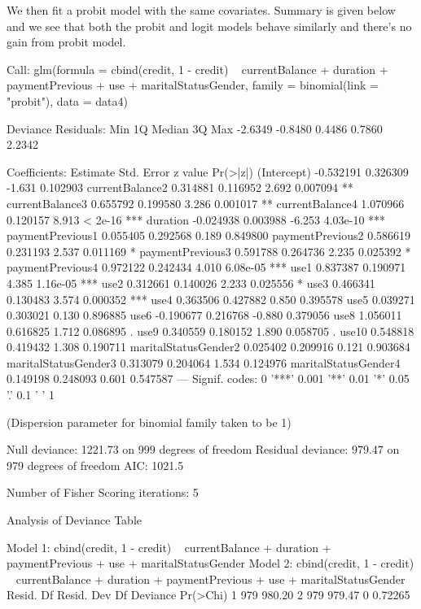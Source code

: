 \documentclass{article}
\begin{document}
We then fit a probit model with the same covariates. Summary is given below and we see that both the probit and logit models behave similarly and there's no gain from probit model.

\begin{Schunk}
\begin{Soutput}
Call:
glm(formula = cbind(credit, 1 - credit) ~ currentBalance + duration + 
    paymentPrevious + use + maritalStatusGender, family = binomial(link = "probit"), 
    data = data4)

Deviance Residuals: 
    Min       1Q   Median       3Q      Max  
-2.6349  -0.8480   0.4486   0.7860   2.2342  

Coefficients:
                      Estimate Std. Error z value Pr(>|z|)    
(Intercept)          -0.532191   0.326309  -1.631 0.102903    
currentBalance2       0.314881   0.116952   2.692 0.007094 ** 
currentBalance3       0.655792   0.199580   3.286 0.001017 ** 
currentBalance4       1.070966   0.120157   8.913  < 2e-16 ***
duration             -0.024938   0.003988  -6.253 4.03e-10 ***
paymentPrevious1      0.055405   0.292568   0.189 0.849800    
paymentPrevious2      0.586619   0.231193   2.537 0.011169 *  
paymentPrevious3      0.591788   0.264736   2.235 0.025392 *  
paymentPrevious4      0.972122   0.242434   4.010 6.08e-05 ***
use1                  0.837387   0.190971   4.385 1.16e-05 ***
use2                  0.312661   0.140026   2.233 0.025556 *  
use3                  0.466341   0.130483   3.574 0.000352 ***
use4                  0.363506   0.427882   0.850 0.395578    
use5                  0.039271   0.303021   0.130 0.896885    
use6                 -0.190677   0.216768  -0.880 0.379056    
use8                  1.056011   0.616825   1.712 0.086895 .  
use9                  0.340559   0.180152   1.890 0.058705 .  
use10                 0.548818   0.419432   1.308 0.190711    
maritalStatusGender2  0.025402   0.209916   0.121 0.903684    
maritalStatusGender3  0.313079   0.204064   1.534 0.124976    
maritalStatusGender4  0.149198   0.248093   0.601 0.547587    
---
Signif. codes:  0 '***' 0.001 '**' 0.01 '*' 0.05 '.' 0.1 ' ' 1

(Dispersion parameter for binomial family taken to be 1)

    Null deviance: 1221.73  on 999  degrees of freedom
Residual deviance:  979.47  on 979  degrees of freedom
AIC: 1021.5

Number of Fisher Scoring iterations: 5
\end{Soutput}
\begin{Soutput}
Analysis of Deviance Table

Model 1: cbind(credit, 1 - credit) ~ currentBalance + duration + paymentPrevious + 
    use + maritalStatusGender
Model 2: cbind(credit, 1 - credit) ~ currentBalance + duration + paymentPrevious + 
    use + maritalStatusGender
  Resid. Df Resid. Dev Df Deviance Pr(>Chi)
1       979     980.20                     
2       979     979.47  0  0.72265         
\end{Soutput}
\end{Schunk}
\end{document}
